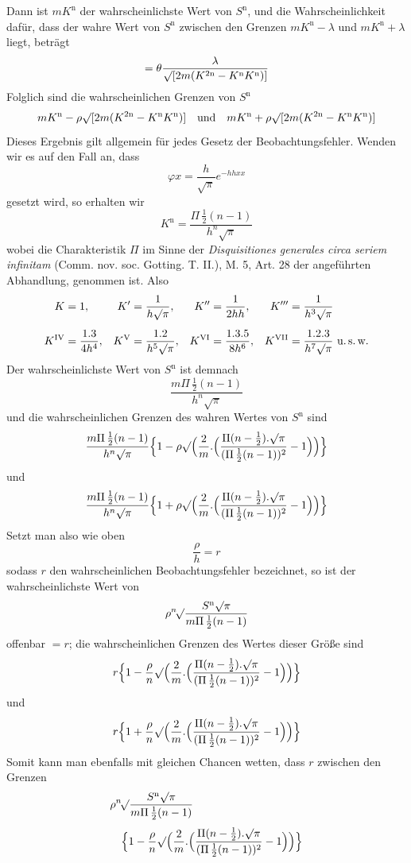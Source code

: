 Dann ist \(mK^{\mathrm n}\) der wahrscheinlichste Wert von \(S^{\mathrm n}\), und die Wahrscheinlichkeit dafür, dass der wahre Wert von \(S^{\mathrm n}\) zwischen den Grenzen \(mK^{\mathrm n}-\lambda\) und \(mK^{\mathrm n}+\lambda\) liegt, beträgt
\[
=\theta\frac{\lambda}{\surd[2m(K^{2\mathrm n}-K^{\mathrm n}K^{\mathrm n})]}
\]
Folglich sind die wahrscheinlichen Grenzen von \(S^{\mathrm n}\)
\[
mK^{\mathrm n}-\rho\surd[2m(K^{2\mathrm n}-K^{\mathrm n}K^{\mathrm n})]\quad\text{und}\quad
mK^{\mathrm n}+\rho\surd[2m(K^{2\mathrm n}-K^{\mathrm n}K^{\mathrm n})]
\]
Dieses Ergebnis gilt allgemein für jedes Gesetz der Beobachtungsfehler. Wenden wir es auf den Fall an, dass
\[
\varphi x=\frac h{\surd\pi}e^{-hhxx}
\]
gesetzt wird, so erhalten wir
\[
K^{\mathrm n}=\frac{\Pi\,\frac12(n-1)}{h^n\surd\pi}
\]
wobei die Charakteristik \(\Pi\) im Sinne der \textit{Disquisitiones generales circa seriem infinitam} (Comm. nov. soc. Gotting. T. II.), M. 5, Art. 28 der angeführten Abhandlung, genommen ist. Also
\[
\begin{aligned}
K&=1,&K'&=\frac1{h\surd\pi},&K''&=\frac1{2hh},&K'''&=\frac1{h^3\surd\pi}\\[5pt]
K^{\mathrm{IV}}&=\frac{1.3}{4h^4},&K^{\mathrm{V}}&=\frac{1.2}{h^5\surd\pi},&K^{\mathrm{VI}}&=\frac{1.3.5}{8h^6},&K^{\mathrm{VII}}&=\frac{1.2.3}{h^7\surd\pi}\text{ u.\,s.\,w.}
\end{aligned}
\]
Der wahrscheinlichste Wert von \(S^{\mathrm n}\) ist demnach
\[
\frac{m\Pi\,\frac12(n-1)}{h^n\surd\pi}
\]
und die wahrscheinlichen Grenzen des wahren Wertes von \(S^{\mathrm n}\) sind
\[
\frac{m\Pi\,\frac12(n-1)}{h^n\surd\pi}\Bigl\{1-\rho\surd\Bigl(\frac2m.\Bigl(\frac{\Pi(n-\frac12).\surd\pi}{(\Pi\,\frac12(n-1))^2}-1\Bigr)\Bigr)\Bigr\}
\]
und
\[
\frac{m\Pi\,\frac12(n-1)}{h^n\surd\pi}\Bigl\{1+\rho\surd\Bigl(\frac2m.\Bigl(\frac{\Pi(n-\frac12).\surd\pi}{(\Pi\,\frac12(n-1))^2}-1\Bigr)\Bigr)\Bigr\}
\]
Setzt man also wie oben
\[
\frac\rho h=r
\]
sodass \(r\) den wahrscheinlichen Beobachtungsfehler bezeichnet, so ist der wahrscheinlichste Wert von
\[
\rho\BareRoot[n]{\frac{S^{\mathrm n}\surd\pi}{m\Pi\,\frac12(n-1)}}
\]
offenbar \(=r\); die wahrscheinlichen Grenzen des Wertes dieser Größe sind
\[
r\Bigl\{1-\frac\rho n\surd\Bigl(\frac2m.\Bigl(\frac{\Pi(n-\frac12).\surd\pi}{(\Pi\,\frac12(n-1))^2}-1\Bigr)\Bigr)\Bigr\}
\]
und
\[
r\Bigl\{1+\frac\rho n\surd\Bigl(\frac2m.\Bigl(\frac{\Pi(n-\frac12).\surd\pi}{(\Pi\,\frac12(n-1))^2}-1\Bigr)\Bigr)\Bigr\}
\]
Somit kann man ebenfalls mit gleichen Chancen wetten, dass \(r\) zwischen den Grenzen
\[
\begin{aligned}
&\rho\BareRoot[n]{\frac{S^{\mathrm n}\surd\pi}{m\Pi\,\frac12(n-1)}}\\[3pt]
&\quad\Bigl\{1-\frac\rho n\surd\Bigl(\frac2m.\Bigl(\frac{\Pi(n-\frac12).\surd\pi}{(\Pi\,\frac12(n-1))^2}-1\Bigr)\Bigr)\Bigr\}
\end{aligned}
\]
